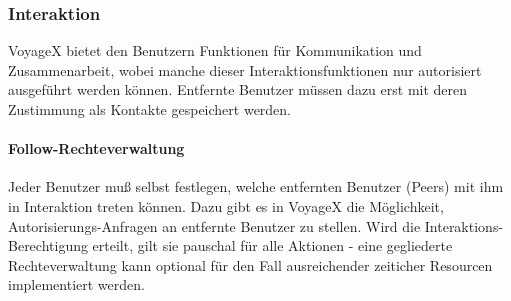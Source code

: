\subsubsection{Interaktion}
VoyageX bietet den Benutzern Funktionen für Kommunikation und Zusammenarbeit, wobei manche dieser Interaktionsfunktionen nur autorisiert ausgeführt werden können. Entfernte Benutzer müssen dazu erst mit deren Zustimmung als Kontakte gespeichert werden.

\paragraph{Follow-Rechteverwaltung}
Jeder Benutzer muß selbst festlegen, welche entfernten Benutzer (Peers) mit ihm in Interaktion
treten können.
Dazu gibt es in VoyageX die Möglichkeit, Autorisierungs-Anfragen an entfernte Benutzer zu stellen.
Wird die Interaktions-Berechtigung erteilt, gilt sie pauschal für alle Aktionen - eine gegliederte Rechteverwaltung kann optional für den Fall ausreichender zeiticher Resourcen implementiert werden.


